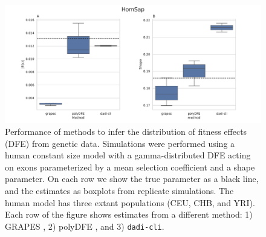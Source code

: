 \documentclass[hidelinks]{article}
\newcommand{\dadicli}{\texttt{dadi-cli}\xspace}
\begin{document}
\begin{figure}[h]
    \centering
    \includegraphics[width=\textwidth]{figures/HomSap/Constant/HomSap_Constant_Gamma_K17_ensembl_havana_104_exons_DFE_plot}
    \caption{
    Performance of methods to infer the distribution of fitness effects (DFE) from genetic data.
    Simulations were performed using a human constant size model with a gamma-distributed DFE
    acting on exons parameterized by a mean selection coefficient and a shape parameter. On each row we show the true parameter 
    as a black line, and the estimates as boxplots from replicate simulations. The human model has three extant populations (CEU, CHB, and YRI).
    Each row of the figure shows estimates from a different method: 1) GRAPES \citep{galtier2016adaptive}, 2) polyDFE \citep{tataru2020polydfe}, and 3) \dadicli \citep{Huang2023}.
    }
    \label{fig:homsap-dfe.constant}    
\end{figure}
\end{document}
